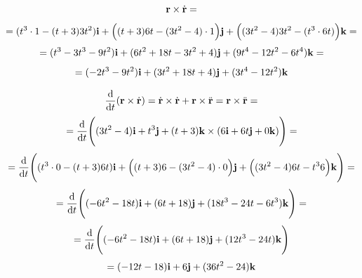 \documentclass{article}
\begin{document}
\begin{equation*}
    \vb{r} \times \dot{\vb{r}} = 
\end{equation*}
\begin{equation*}
    = (t^3 \cdot 1 - (t+3)3t^{2})\vb{i} + \Big((t+3)6t - (3t^{2} - 4) \cdot 1\Big)\vb{j} + \Big((3t^{2} - 4)3t^{2} - (t^{3} \cdot 6t)\Big)\vb{k} =
\end{equation*}
\begin{equation*}
    = (t^3 - 3t^{3} - 9t^2)\vb{i} + (6t^2 + 18t - 3t^2 + 4)\vb{j} + (9t^4 - 12t^2 - 6t^4)\vb{k} =
\end{equation*}
\begin{equation*}
    = (-2t^{3} - 9t^{2})\vb{i} + (3t^{2} + 18t + 4)\vb{j} + (3t^{4} - 12t^{2})\vb{k}
\end{equation*}

\begin{equation*}
    \dv{t}(\vb{r} \times \dot{\vb{r}}) = \dot{\vb{r}} \times \dot{\vb{r}} + \vb{r} \times \ddot{\vb{r}} = \vb{r} \times \ddot{\vb{r}} =
\end{equation*}
\begin{equation*}
    = \dv{t}\Bigg((3t^{2} - 4)\vb{i} + t^{3}\vb{j} + (t+3)\vb{k} \times (6\vb{i} + 6t\vb{j} + 0 \vb{k})\Bigg) =
\end{equation*}
\begin{equation*}
    = \dv{t}\Bigg((t^3 \cdot 0 - (t + 3)6t)\vb{i} + \Big((t+3)6 - (3t^{2} - 4) \cdot 0\Big)\vb{j} + \Big((3t^{2} - 4)6t - t^{3}6\Big)\vb{k}\Bigg) =
\end{equation*}
\begin{equation*}
    = \dv{t}\Bigg((-6t^{2} - 18t)\vb{i} + (6t + 18)\vb{j} + (18t^{3} - 24t - 6t^3)\vb{k}\Bigg) = 
\end{equation*}
\begin{equation*}
    = \dv{t}\Bigg((-6t^{2} - 18t)\vb{i} + (6t + 18)\vb{j} + (12t^{3} - 24t)\vb{k}\Bigg)
\end{equation*}
\begin{equation*}
    = (-12t - 18)\vb{i} + 6\vb{j} + (36t^{2} - 24)\vb{k}
\end{equation*}
\end{document}
